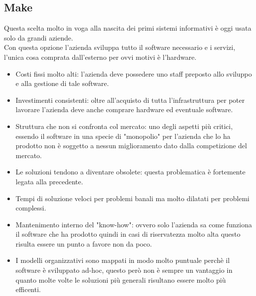 \documentclass[../main.tex]{subfiles}
\begin{document}
	\subsection{Make}
	Questa scelta molto in voga alla nascita dei primi sistemi informativi è oggi usata solo da grandi aziende.\\
	Con questa opzione l'azienda sviluppa tutto il software necessario e i servizi, l'unica cosa comprata dall'esterno per ovvi motivi è l'hardware.
	\begin{itemize}
		\item Costi fissi molto alti: l'azienda deve possedere uno staff preposto allo sviluppo e alla gestione di tale software.
		\item Investimenti consistenti: oltre all'acquisto di tutta l'infrastruttura per poter lavorare l'azienda deve anche comprare hardware ed eventuale software.
		\item Struttura che non si confronta col mercato: uno degli aspetti più critici, essendo il software in una specie di "monopolio" per l'azienda che lo ha prodotto non è soggetto a nessun miglioramento dato dalla competizione del mercato.
		\item Le soluzioni tendono a diventare obsolete: questa problematica è fortemente legata alla precedente.
		\item Tempi di soluzione veloci per problemi banali ma molto dilatati per problemi complessi.
		\item Mantenimento interno del "know-how": ovvero solo l'azienda sa come funziona il software che ha prodotto quindi in casi di riservatezza molto alta questo risulta essere un punto a favore non da poco.
		\item I modelli organizzativi sono mappati in modo molto puntuale perchè il software è sviluppato ad-hoc, questo però non è sempre un vantaggio in quanto molte volte le soluzioni più generali risultano essere molto più efficenti.
	\end{itemize}
\end{document}
